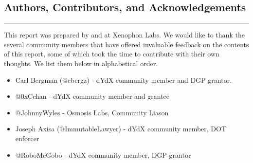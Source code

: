 \begin{fullwidth}
    \section{Authors, Contributors, and Acknowledgements} \label{app:authors}

    \textcolor{gray}{\rule{\linewidth}{0.1mm}}
\end{fullwidth}
    
    This report was prepared by  and  at Xenophon Labs. We would like to thank the several community members that have offered invaluable feedback on the contents of this report, some of which took the time to contribute with their own thoughts. We list them below in alphabetical order.

    \begin{itemize}
        \item Carl Bergman (@cbergz) - dYdX community member and DGP grantor.
        \item @0xCchan - dYdX community member and grantee
        \item @JohnnyWyles - Osmosis Labs, Community Liason
        \item Joseph Axisa (@ImmutableLawyer) - dYdX community member, DOT enforcer
        \item @RoboMcGobo - dYdX community member, DGP grantor
    \end{itemize}
